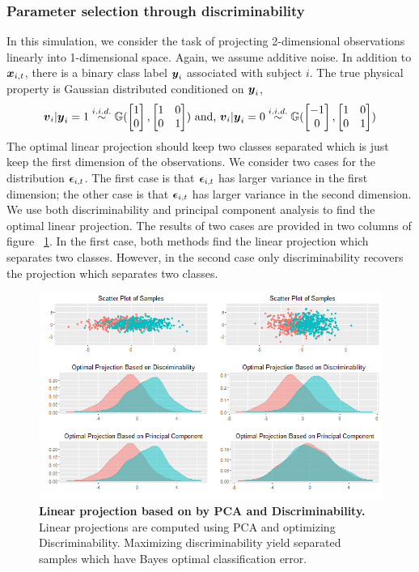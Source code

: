\documentclass{article}
\begin{document}
\subsubsection{Parameter selection through discriminability  }
In this simulation, we consider the task of projecting 2-dimensional observations linearly into 1-dimensional space. Again, we assume additive noise. In addition to $\boldsymbol{x}_{i,t}$, there is a binary class label $\boldsymbol{y}_{i}$ associated with subject $i$. The true physical property is Gaussian distributed conditioned on $\boldsymbol{y}_i$,
\[\boldsymbol{v}_i|\boldsymbol{y}_i=1 \overset{i.i.d.}{\sim} \mathbb{G}(\begin{bmatrix}1\\0\end{bmatrix},\begin{bmatrix}1& 0\\0& 1\end{bmatrix}) \text{ and, } \boldsymbol{v}_i|\boldsymbol{y}_i=0 \overset{i.i.d.}{\sim} \mathbb{G}(\begin{bmatrix}-1\\0\end{bmatrix},\begin{bmatrix}1& 0\\0& 1\end{bmatrix}) \]
The optimal linear projection should keep two classes separated which is just keep the first dimension of the observations. We consider two cases for the distribution $\boldsymbol{\epsilon}_{i,t}$. The first case is that $\boldsymbol{\epsilon}_{i,t}$ has larger variance in the first dimension; the other case is that $\boldsymbol{\epsilon}_{i,t}$ has larger variance in the second dimension. We use both discriminability and principal component analysis to find the optimal linear projection. The results of two cases are provided in two columns of figure ~\ref{fig:sel}. In the first case, both methods find the linear projection which separates two classes. However, in the second case only discriminability recovers the projection which separates two classes. 

\begin{figure}[ht!]
	\includegraphics[width=\linewidth]{../Figs/opt_proj.png}
	\caption{{\bf Linear projection based on by PCA and Discriminability.} Linear projections are computed using PCA and optimizing Discriminability. Maximizing discriminability yield separated samples which have Bayes optimal classification error. }
	\label{fig:sel}
\end{figure}
\end{document}
